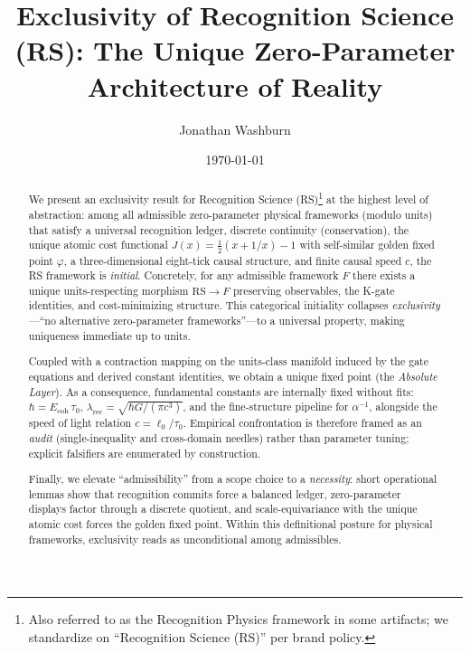 \documentclass[11pt]{article}
\title{Exclusivity of Recognition Science (RS): The Unique Zero\mbox{-}Parameter Architecture of Reality}
\author{Jonathan Washburn}
\date{\today}
\begin{document}
\maketitle

\begin{abstract}
We present an exclusivity result for Recognition Science (RS)\footnote{Also referred to as the Recognition Physics framework in some artifacts; we standardize on “Recognition Science (RS)” per brand policy.} at the highest level of abstraction: among all admissible zero\mbox{-}parameter physical frameworks (modulo units) that satisfy a universal recognition ledger, discrete continuity (conservation), the unique atomic cost functional \(J(x)=\tfrac{1}{2}(x+1/x)-1\) with self\mbox{-}similar golden fixed point \(\varphi\), a three\mbox{-}dimensional eight\mbox{-}tick causal structure, and finite causal speed \(c\), the RS framework is \emph{initial}. Concretely, for any admissible framework \(F\) there exists a unique units\mbox{-}respecting morphism \(\mathrm{RS}\to F\) preserving observables, the K\mbox{-}gate identities, and cost\mbox{-}minimizing structure. This categorical initiality collapses \emph{exclusivity}---``no alternative zero\mbox{-}parameter frameworks''---to a universal property, making uniqueness immediate up to units.

Coupled with a contraction mapping on the units\mbox{-}class manifold induced by the gate equations and derived constant identities, we obtain a unique fixed point (the \emph{Absolute Layer}). As a consequence, fundamental constants are internally fixed without fits: \(\hbar = E_{\mathrm{coh}}\,\tau_0\), \(\lambda_{\mathrm{rec}} = \sqrt{\hbar G/(\pi c^3)}\), and the fine\mbox{-}structure pipeline for \(\alpha^{-1}\), alongside the speed of light relation \(c=\ell_0/\tau_0\). Empirical confrontation is therefore framed as an \emph{audit} (single\mbox{-}inequality and cross\mbox{-}domain needles) rather than parameter tuning; explicit falsifiers are enumerated by construction.

Finally, we elevate ``admissibility'' from a scope choice to a \emph{necessity}: short operational lemmas show that recognition commits force a balanced ledger, zero\mbox{-}parameter displays factor through a discrete quotient, and scale\mbox{-}equivariance with the unique atomic cost forces the golden fixed point. Within this definitional posture for physical frameworks, exclusivity reads as unconditional among admissibles.
\end{abstract}
\end{document}
